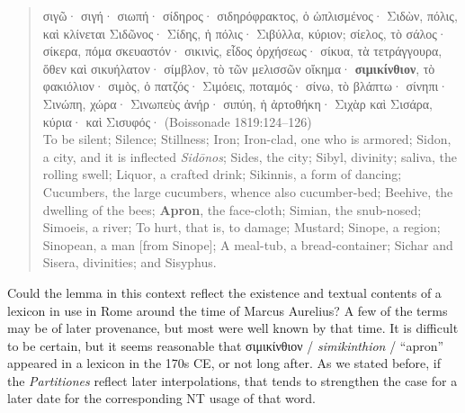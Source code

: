  \begin{quote}σιγῶ· σιγή· σιωπή· \newline %
 σίδηρος· σιδηρόφρακτος, ὁ ὡπλισμένος· \newline %
 Σιδὼν, πόλις, καὶ κλίνεται Σιδῶνος· Σίδης, ἡ πόλις· \newline %
 Σιβύλλα, κύριον; σίελος, τὸ σάλος· \newline %
 σίκερα, πόμα σκευαστόν· σικινὶς, εἶδος ὀρχήσεως· \newline %
 σίκυα, τὰ τετράγγουρα, ὅθεν καὶ σικυήλατον· \newline %
 σίμβλον, τὸ τῶν μελισσῶν οἴκημα· \newline %
 \textbf{σιμικίνθιον}, τὸ φακιόλιον· \newline %
 σιμὸς, ὁ πατζός· Σιμόεις, ποταμός· \newline %
 σίνω, τὸ βλάπτω· \newline %
 σίνηπι· Σινώπη, χώρα· Σινωπεὺς ἀνήρ· \newline %
 σιπύη, ἡ ἀρτοθήκη· \newline %
 Σιχὰρ καὶ Σισάρα, κύρια· καὶ Σισυφός· (Boissonade 1819:124--126) \\[1mm]
 To be silent; Silence; Stillness; \newline %
 Iron; Iron-clad, one who is armored; \newline %
 Sidon, a city, and it is inflected \textit{Sidōnos}; Sides, the city; \newline %
 Sibyl, divinity; saliva, the rolling swell; \newline %
 Liquor, a crafted drink; Sikinnis, a form of dancing; \newline %
 Cucumbers, the large cucumbers, whence also cucumber-bed; \newline %
 Beehive, the dwelling of the bees; \newline %
 \textbf{Apron}, the face-cloth; \newline
 Simian, the snub-nosed; Simoeis, a river; \newline
 To hurt, that is, to damage; \newline %
 Mustard; Sinope, a region; Sinopean, a man [from Sinope]; \newline %
 A meal-tub, a bread-container; \newline %
 Sichar and Sisera, divinities; and Sisyphus.%
 \end{quote} %
 \clearpage

Could the lemma in this context reflect the existence and textual contents of a lexicon %
in use in Rome around the time of Marcus Aurelius? %
A few of the terms may be of later provenance, %
but most were well known by that time. 
It is difficult to be certain, %
but it seems reasonable that σιμικίνθιον / \textit{simikinthion} / “apron” appeared %
in a lexicon in the 170s CE, or not long after. %
As we stated before, if the \textit{Partitiones} reflect later interpolations, %
that tends to strengthen the case for a later date for the corresponding NT usage of that word. %

